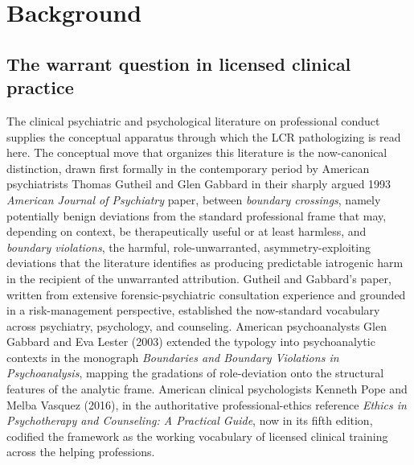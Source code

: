 \documentclass[11pt]{article}
\begin{document}
\section{Background}

\subsection{The warrant question in licensed clinical practice}

The clinical psychiatric and psychological literature on professional conduct supplies the conceptual apparatus through which the LCR pathologizing is read here. The conceptual move that organizes this literature is the now-canonical distinction, drawn first formally in the contemporary period by American psychiatrists Thomas Gutheil and Glen Gabbard in their sharply argued 1993 \emph{American Journal of Psychiatry} paper, between \emph{boundary crossings}, namely potentially benign deviations from the standard professional frame that may, depending on context, be therapeutically useful or at least harmless, and \emph{boundary violations}, the harmful, role-unwarranted, asymmetry-exploiting deviations that the literature identifies as producing predictable iatrogenic harm in the recipient of the unwarranted attribution. Gutheil and Gabbard's paper, written from extensive forensic-psychiatric consultation experience and grounded in a risk-management perspective, established the now-standard vocabulary across psychiatry, psychology, and counseling. American psychoanalysts Glen Gabbard and Eva Lester (2003) extended the typology into psychoanalytic contexts in the monograph \emph{Boundaries and Boundary Violations in Psychoanalysis}, mapping the gradations of role-deviation onto the structural features of the analytic frame. American clinical psychologists Kenneth Pope and Melba Vasquez (2016), in the authoritative professional-ethics reference \emph{Ethics in Psychotherapy and Counseling: A Practical Guide}, now in its fifth edition, codified the framework as the working vocabulary of licensed clinical training across the helping professions.
\end{document}
